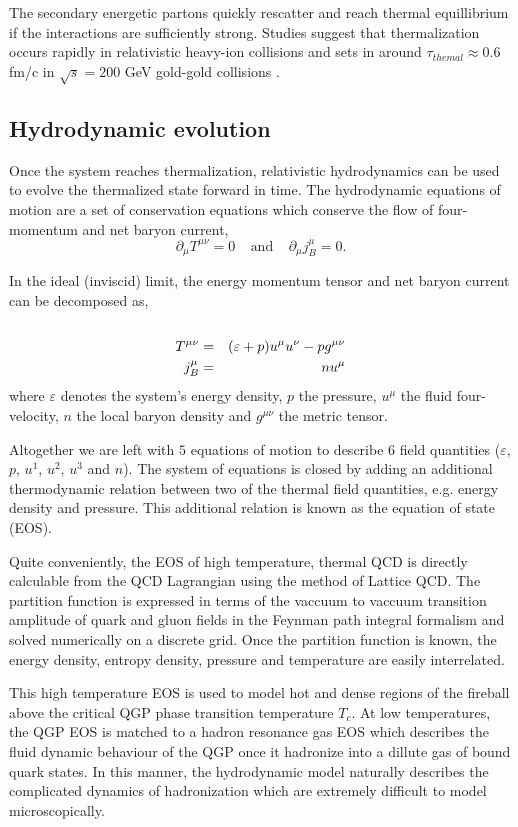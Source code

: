 \documentclass[aps,prc,reprint,amsmath,nofootinbib]{revtex4-1}
\begin{document}
The secondary energetic partons quickly rescatter and reach thermal equillibrium if the interactions are sufficiently strong. Studies suggest that thermalization 
occurs rapidly in relativistic heavy-ion collisions and sets in around $\tau_{themal} \approx 0.6$ fm/c in $\sqrt{s} = 200$ GeV gold-gold collisions \cite{Heinz:2001xi}.

\subsection{Hydrodynamic evolution}

Once the system reaches thermalization, relativistic hydrodynamics can be used to evolve the thermalized state forward in time. The hydrodynamic equations of motion 
are a set of conservation equations which conserve the flow of four-momentum and net baryon current,
\begin{equation}
 \partial_\mu T^{\mu\nu} = 0 ~~~~~\mbox{and}~~~~~ \partial_\mu j_B^\mu = 0.
\end{equation}

In the ideal (inviscid) limit, the energy momentum tensor and net baryon current can be decomposed as,
\begin{eqnarray}
 \cr T^{\mu\nu} &=& (\varepsilon + p) u^\mu u^\nu - p g^{\mu\nu} \\
 j_B^\mu &=& n u^\mu
\end{eqnarray}
where $\varepsilon$ denotes the system's energy density, $p$ the pressure, $u^\mu$ the fluid four-velocity, $n$ the local baryon density and $g^{\mu\nu}$ the metric 
tensor.

Altogether we are left with $5$ equations of motion to describe $6$ field quantities ($\varepsilon$, $p$, $u^1$, $u^2$, $u^3$ and $n$).
The system of equations is closed by adding an additional thermodynamic relation between two of the thermal field quantities, e.g. energy density and pressure. 
This additional relation is known as the equation of state (EOS).

Quite conveniently, the EOS of high temperature, thermal QCD is directly calculable from the QCD Lagrangian using the method of Lattice QCD. The partition function
is expressed in terms of the vaccuum to vaccuum transition amplitude of quark and gluon fields in the Feynman path integral formalism and solved numerically on a
discrete grid. Once the partition function is known, the energy density, entropy density, pressure and temperature are easily interrelated. 

This high temperature EOS is used to model hot and dense regions of the fireball above the critical QGP phase transition temperature $T_c$. At low temperatures,
the QGP EOS is matched to a hadron resonance gas EOS which describes the fluid dynamic behaviour of the QGP once it hadronize into a dillute gas of bound quark
states. In this manner, the hydrodynamic model naturally describes the complicated dynamics of hadronization which are extremely difficult to model microscopically.
\end{document}
